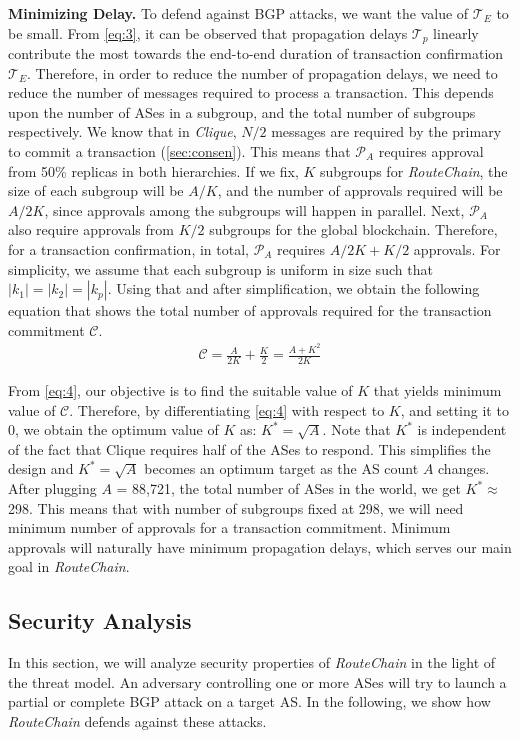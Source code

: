 \documentclass[conference]{IEEEtran}
\newcommand{\BfPara}[1]{{\noindent\bf#1.}\xspace}
\newcommand{\rc}{{{\em RouteChain}}\xspace}
\begin{document}
\BfPara{Minimizing Delay}\label{sec:mind}
To defend against BGP attacks, we want the value of $ \mathcal{T}_{E}$ to be small. From \autoref{eq:3}, it can be observed that propagation delays  $\mathcal{T}_{p}$ linearly contribute the most towards the end-to-end duration of transaction confirmation $\mathcal{T}_{E}$. Therefore, in order to reduce the number of propagation delays, we need to reduce the number of messages required to process a transaction. This depends upon the number of ASes in a subgroup, and the total number of subgroups respectively. We know that in {\em Clique}, $N/2$ messages are required by the primary to commit a transaction (\textsection\ref{sec:consen}). This means that $\mathcal{P}_{A}$ requires approval from 50\% replicas in both hierarchies. If we fix, $K$ subgroups for \rc, the size of each subgroup will be $A/K$, and the number of approvals required will be $A/2K$, since approvals among the subgroups will happen in parallel. Next, $\mathcal{P}_{A}$ also require approvals from $K/2$ subgroups for the global blockchain. Therefore, for a transaction confirmation, in total, $\mathcal{P}_{A}$ requires $A/2K + K/2$ approvals. For simplicity, we assume that each subgroup is uniform in size such that $|k_{1}|=|k_{2}|=|k_{p}|$. Using that and after simplification, we obtain the following equation that shows the total number of approvals required for the transaction commitment $\mathcal{C}$. 
\begin{align}\label{eq:4}
\mathcal{C} = \frac{A }{2K} + \frac{K}{2}= \frac{A + K^{2}}{2K}
\end{align}

From \autoref{eq:4}, our objective is to find the suitable value of $K$ that yields minimum value of $\mathcal{C}$. Therefore, by differentiating \autoref{eq:4} with respect to $K$, and setting it to $0$, we obtain the optimum value of $K$ as:  $K^* = \sqrt{A}$.  Note that $K^*$ is independent of the fact that Clique requires half of the ASes to respond. This simplifies the design and $K^* = \sqrt{A}$ becomes an optimum target as the AS count $A$ changes. After plugging $A$ = 88,721, the total number of ASes in the world, we get $K^* \approx$ 298. This means that with number of subgroups fixed at 298, we will need minimum number of approvals for a transaction commitment. Minimum approvals will naturally have minimum propagation delays, which serves our main goal in \rc. 

\subsection{Security Analysis}\label{sec:SA}
In this section, we will analyze security properties of \rc in the light of the threat model. An adversary controlling one or more ASes will try to launch a partial or complete BGP attack on a target AS. In the following, we show how \rc defends against these attacks. 
\end{document}
